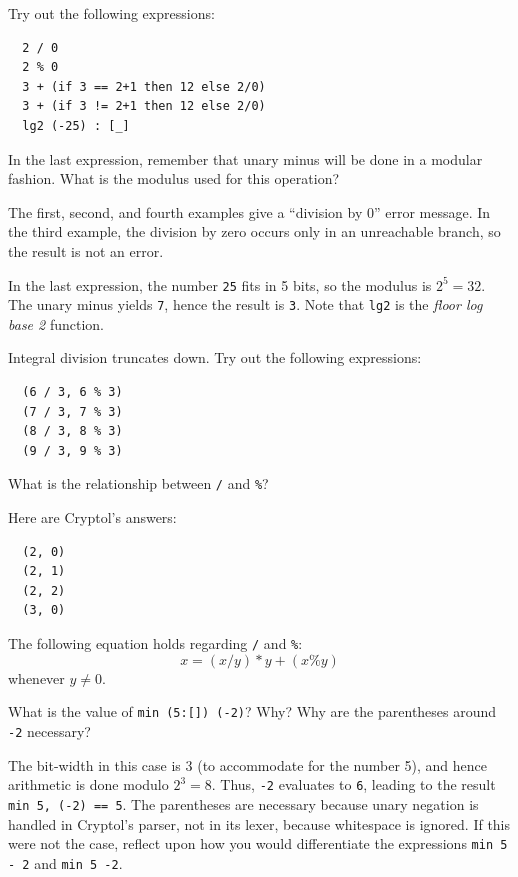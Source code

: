 \begin{Exercise}\label{ex:arith:4}
Try out the following expressions:\indEq\indNeq
\begin{Verbatim}
  2 / 0
  2 % 0
  3 + (if 3 == 2+1 then 12 else 2/0)
  3 + (if 3 != 2+1 then 12 else 2/0)
  lg2 (-25) : [_]
\end{Verbatim}
In the last expression, remember that unary minus will\indUnaryMinus
be done in a modular fashion. What is the modulus used for this
operation?
\end{Exercise}
\begin{Answer}
  The first, second, and fourth examples give a ``division by 0''
  error message. In the third example, the division by zero occurs
  only in an unreachable branch, so the result is not an error.

  In the last expression, the number \texttt{25} fits in 5 bits, so
  the modulus is $2^5 = 32$. The unary minus yields \texttt{7}, hence
  the result is \texttt{3}. Note that \texttt{lg2} is the \emph{floor
    log base 2} function.\indLg\indEq\indNeq
\end{Answer}

\begin{Exercise}\label{ex:arith:5:1}
Integral division truncates down. Try out the following expressions:\indDiv\indMod
\begin{Verbatim}
  (6 / 3, 6 % 3)
  (7 / 3, 7 % 3)
  (8 / 3, 8 % 3)
  (9 / 3, 9 % 3)
\end{Verbatim}
What is the relationship between {\tt /} and {\tt \%}?
\end{Exercise}
\begin{Answer}
Here are Cryptol's answers:\indDiv\indMod
\begin{Verbatim}
  (2, 0)
  (2, 1)
  (2, 2)
  (3, 0)
\end{Verbatim}
The following equation holds regarding {\tt /} and {\tt \%}:
$$
  x = (x / y) * y + (x \% y)
$$
whenever $y \neq 0$.
\end{Answer}

\begin{Exercise}\label{ex:arith:5}
  What is the value of \texttt{min (5:[\textunderscore]) (-2)}? Why?
  Why are the parentheses around \texttt{-2}
  necessary?\indMin\indModular\indUnaryMinus
\end{Exercise}
\begin{Answer}
  The bit-width in this case is 3 (to accommodate for the number 5),
  and hence arithmetic is done modulo $2^3 = 8$. Thus, {\tt -2}
  evaluates to {\tt 6}, leading to the result {\tt min 5, (-2) == 5}.
  The parentheses are necessary because unary negation is handled in
  Cryptol's parser, not in its lexer, because whitespace is ignored.
  If this were not the case, reflect upon how you would differentiate
  the expressions \texttt{min 5 - 2} and \texttt{min 5 -2}.
\end{Answer}

